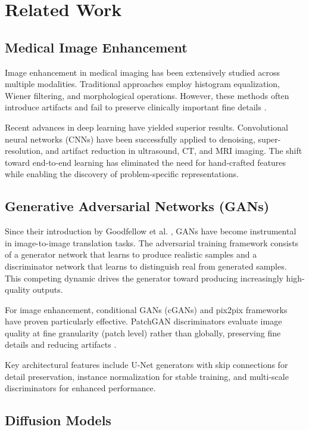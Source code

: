 \documentclass[10pt,conference,letterpaper]{IEEEtran}
\begin{document}
\section{Related Work}
\label{sec:related}

\subsection{Medical Image Enhancement}

Image enhancement in medical imaging has been extensively studied across multiple modalities. Traditional approaches employ histogram equalization, Wiener filtering, and morphological operations. However, these methods often introduce artifacts and fail to preserve clinically important fine details \cite{EchoNet_Quality_Denoising_Echocardiograms}.

Recent advances in deep learning have yielded superior results. Convolutional neural networks (CNNs) have been successfully applied to denoising, super-resolution, and artifact reduction in ultrasound, CT, and MRI imaging. The shift toward end-to-end learning has eliminated the need for hand-crafted features while enabling the discovery of problem-specific representations.

\subsection{Generative Adversarial Networks (GANs)}

Since their introduction by Goodfellow et al. \cite{2401.00153v2}, GANs have become instrumental in image-to-image translation tasks. The adversarial training framework consists of a generator network that learns to produce realistic samples and a discriminator network that learns to distinguish real from generated samples. This competing dynamic drives the generator toward producing increasingly high-quality outputs.

For image enhancement, conditional GANs (cGANs) and pix2pix frameworks have proven particularly effective. PatchGAN discriminators evaluate image quality at fine granularity (patch level) rather than globally, preserving fine details and reducing artifacts \cite{EchoNet_Quality_Denoising_Echocardiograms}.

Key architectural features include U-Net generators with skip connections for detail preservation, instance normalization for stable training, and multi-scale discriminators for enhanced performance.

\subsection{Diffusion Models}
\end{document}
